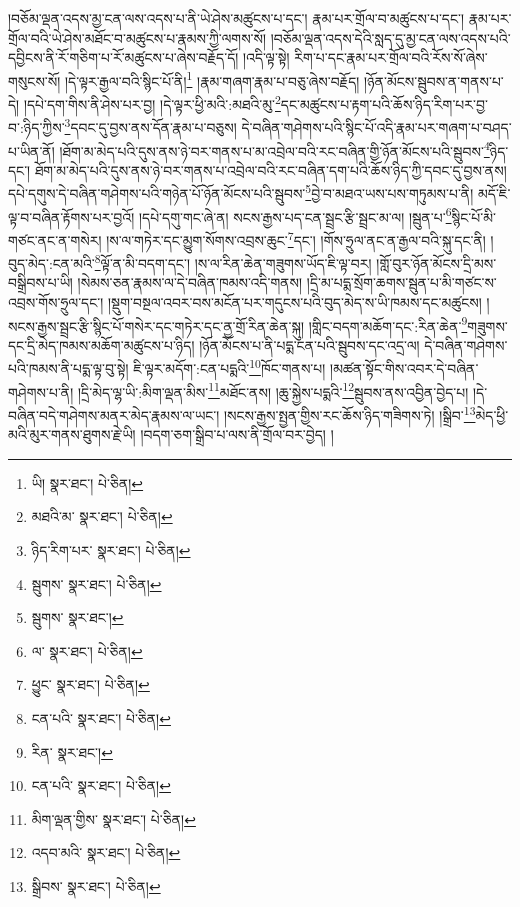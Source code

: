 །བཅོམ་ལྡན་འདས་མྱ་ངན་ལས་འདས་པ་ནི་ཡེ་ཤེས་མཚུངས་པ་དང་། རྣམ་པར་གྲོལ་བ་མཚུངས་པ་དང་། རྣམ་པར་གྲོལ་བའི་ཡེ་ཤེས་མཐོང་བ་མཚུངས་པ་རྣམས་ཀྱི་ལགས་སོ། །བཅོམ་ལྡན་འདས་དེའི་སླད་དུ་མྱ་ངན་ལས་འདས་པའི་དབྱིངས་ནི་རོ་གཅིག་པ་རོ་མཚུངས་པ་ཞེས་བརྗོད་དོ། །འདི་ལྟ་སྟེ། རིག་པ་དང་རྣམ་པར་གྲོལ་བའི་རོས་སོ་ཞེས་གསུངས་སོ། །དེ་ལྟར་རྒྱལ་བའི་སྙིང་པོ་ནི།\footnote{ཡི།  སྣར་ཐང་།  པེ་ཅིན། } །རྣམ་གཞག་རྣམ་པ་བཅུ་ཞེས་བརྗོད། །ཉོན་མོངས་སྦུབས་ན་གནས་པ་དེ། །དཔེ་དག་གིས་ནི་ཤེས་པར་བྱ། །དེ་ལྟར་ཕྱི་མའི་:མཐའི་མུ་\footnote{མཐའི་མ་  སྣར་ཐང་།  པེ་ཅིན། }དང་མཚུངས་པ་རྟག་པའི་ཆོས་ཉིད་རིག་པར་བྱ་བ་:ཉིད་ཀྱིས་\footnote{ཉིད་རིག་པར་  སྣར་ཐང་།  པེ་ཅིན། }དབང་དུ་བྱས་ནས་དོན་རྣམ་པ་བཅུས། དེ་བཞིན་གཤེགས་པའི་སྙིང་པོ་འདི་རྣམ་པར་གཞག་པ་བཤད་པ་ཡིན་ནོ། །ཐོག་མ་མེད་པའི་དུས་ནས་ཉེ་བར་གནས་པ་མ་འབྲེལ་བའི་རང་བཞིན་གྱི་ཉོན་མོངས་པའི་སྦུབས་\footnote{སྦུགས་  སྣར་ཐང་།  པེ་ཅིན། }ཉིད་དང་། ཐོག་མ་མེད་པའི་དུས་ནས་ཉེ་བར་གནས་པ་འབྲེལ་བའི་རང་བཞིན་དག་པའི་ཆོས་ཉིད་ཀྱི་དབང་དུ་བྱས་ནས། དཔེ་དགུས་དེ་བཞིན་གཤེགས་པའི་གཉེན་པོ་ཉོན་མོངས་པའི་སྦུབས་\footnote{སྦུགས་  སྣར་ཐང་། }བྱེ་བ་མཐའ་ཡས་པས་གཏུམས་པ་ནི། མདོ་ཇི་ལྟ་བ་བཞིན་རྟོགས་པར་བྱའོ། །དཔེ་དགུ་གང་ཞེ་ན། སངས་རྒྱས་པད་ངན་སྦྲང་རྩི་སྦྲང་མ་ལ། །སྦུན་པ་\footnote{ལ་  སྣར་ཐང་།  པེ་ཅིན། }སྙིང་པོ་མི་གཙང་ནང་ན་གསེར། །ས་ལ་གཏེར་དང་མྱུག་སོགས་འབྲས་ཆུང་\footnote{ཕྱུང་  སྣར་ཐང་།  པེ་ཅིན། }དང་། །གོས་ཧྲུལ་ནང་ན་རྒྱལ་བའི་སྐུ་དང་ནི། །བུད་མེད་:ངན་མའི་\footnote{ངན་པའི་  སྣར་ཐང་།  པེ་ཅིན། }ལྟོ་ན་མི་བདག་དང་། །ས་ལ་རིན་ཆེན་གཟུགས་ཡོད་ཇི་ལྟ་བར། །གློ་བུར་ཉོན་མོངས་དྲི་མས་བསྒྲིབས་པ་ཡི། །སེམས་ཅན་རྣམས་ལ་དེ་བཞིན་ཁམས་འདི་གནས། །དྲི་མ་པདྨ་སྲོག་ཆགས་སྦུན་པ་མི་གཙང་ས་འབྲས་གོས་ཧྲུལ་དང་། །སྡུག་བསྔལ་འབར་བས་མངོན་པར་གདུངས་པའི་བུད་མེད་ས་ཡི་ཁམས་དང་མཚུངས། །སངས་རྒྱས་སྦྲང་རྩི་སྙིང་པོ་གསེར་དང་གཏེར་དང་ནྱ་གྲོ་རིན་ཆེན་སྐུ། །གླིང་བདག་མཆོག་དང་:རིན་ཆེན་\footnote{རིན་  སྣར་ཐང་། }གཟུགས་དང་དྲི་མེད་ཁམས་མཆོག་མཚུངས་པ་ཉིད། །ཉོན་མོངས་པ་ནི་པདྨ་ངན་པའི་སྦུབས་དང་འདྲ་ལ། དེ་བཞིན་གཤེགས་པའི་ཁམས་ནི་པདྨ་ལྟ་བུ་སྟེ། ཇི་ལྟར་མདོག་:ངན་པདྨའི་\footnote{ངན་པའི་  སྣར་ཐང་།  པེ་ཅིན། }ཁོང་གནས་པ། །མཚན་སྟོང་གིས་འབར་དེ་བཞིན་གཤེགས་པ་ནི། །དྲི་མེད་ལྷ་ཡི་:མིག་ལྡན་མིས་\footnote{མིག་ལྡན་གྱིས་  སྣར་ཐང་།  པེ་ཅིན། }མཐོང་ནས། །ཆུ་སྐྱེས་པདྨའི་\footnote{འདབ་མའི་  སྣར་ཐང་།  པེ་ཅིན། }སྦུབས་ནས་འབྱིན་བྱེད་པ། །དེ་བཞིན་བདེ་གཤེགས་མནར་མེད་རྣམས་ལ་ཡང་། །སངས་རྒྱས་སྤྱན་གྱིས་རང་ཆོས་ཉིད་གཟིགས་ཏེ། །སྒྲིབ་\footnote{སྒྲིབས་  སྣར་ཐང་།  པེ་ཅིན། }མེད་ཕྱི་མའི་མུར་གནས་ཐུགས་རྗེ་ཡི། །བདག་ཅག་སྒྲིབ་པ་ལས་ནི་གྲོལ་བར་བྱེད། །
